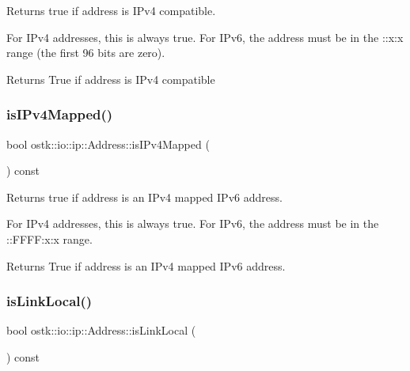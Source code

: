 Returns true if address is I\+Pv4 compatible. 

For I\+Pv4 addresses, this is always true. For I\+Pv6, the address must be in the \+::x\+:x range (the first 96 bits are zero).

\begin{DoxyReturn}{Returns}
True if address is I\+Pv4 compatible 
\end{DoxyReturn}
\mbox{\label{classostk_1_1io_1_1ip_1_1_address_a3967d2bd177d2d14d8245e714af328da}} 
\subsubsection{\texorpdfstring{is\+I\+Pv4\+Mapped()}{isIPv4Mapped()}}
{\footnotesize\ttfamily bool ostk\+::io\+::ip\+::\+Address\+::is\+I\+Pv4\+Mapped (\begin{DoxyParamCaption}{ }\end{DoxyParamCaption}) const}



Returns true if address is an I\+Pv4 mapped I\+Pv6 address. 

For I\+Pv4 addresses, this is always true. For I\+Pv6, the address must be in the \+::\+F\+F\+F\+F\+:x\+:x range.

\begin{DoxyReturn}{Returns}
True if address is an I\+Pv4 mapped I\+Pv6 address. 
\end{DoxyReturn}
\mbox{\label{classostk_1_1io_1_1ip_1_1_address_a8e4414026c04ae1143f3a388d025de53}} 
\subsubsection{\texorpdfstring{is\+Link\+Local()}{isLinkLocal()}}
{\footnotesize\ttfamily bool ostk\+::io\+::ip\+::\+Address\+::is\+Link\+Local (\begin{DoxyParamCaption}{ }\end{DoxyParamCaption}) const}



